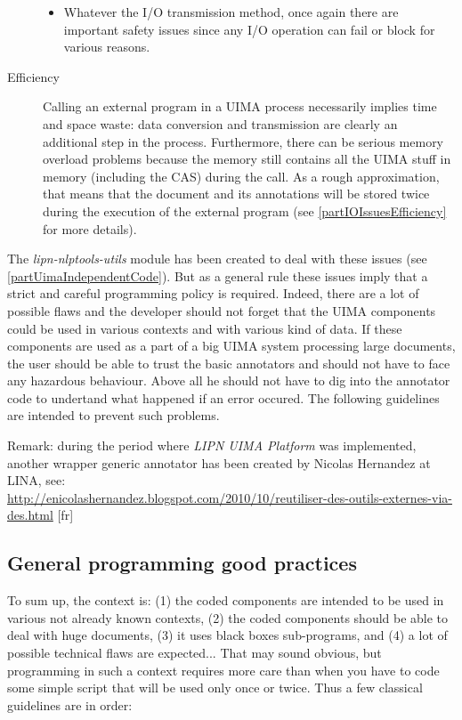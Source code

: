 \documentclass{article}
\newcommand{\softName}{{\em LIPN UIMA Platform}\xspace}
\newenvironment{xitemize}{
\begin{itemize}
  \setlength{\itemsep}{.3\baselineskip}
  \setlength{\topsep}{0pt}
  \setlength{\parskip}{0pt}
  \setlength{\parsep}{0pt}
}{\end{itemize}}
\newcommand{\utilsModule}{{\em lipn-nlptools-utils}\xspace}
\begin{document}
\begin{description}
\begin{xitemize}
\item Whatever the I/O transmission method, once again there are important safety issues since any I/O operation can fail or block for various reasons.
\end{xitemize}
\item[Efficiency] Calling an external program in a UIMA process necessarily implies time and space waste: data conversion and transmission are clearly an additional step in the process. Furthermore, there can be serious memory overload problems because the memory still contains all the UIMA stuff in memory (including the CAS) during the call. As a rough approximation, that means that the document and its annotations will be stored twice during the execution of the external program (see \ref{partIOIssuesEfficiency} for more details).
\end{description}

The \utilsModule module has been created to deal with these issues (see \ref{partUimaIndependentCode}). But as a general rule these issues imply that a strict and careful programming policy is required. Indeed, there are a lot of possible flaws and the developer should not forget that the UIMA components could be used in various contexts and with various kind of data. If these components are used as a part of a big UIMA system processing large documents, the user should be able to trust the basic annotators and should not have to face any hazardous behaviour. Above all he should not have to dig into the annotator code to undertand what happened if an error occured. The following guidelines are intended to prevent such problems.

Remark: during the period where \softName was implemented, another wrapper generic annotator has been created by Nicolas Hernandez at LINA, see:\\ \url{http://enicolashernandez.blogspot.com/2010/10/reutiliser-des-outils-externes-via-des.html} [fr]



\subsection{General programming good practices}
\label{part_good_practices}
\label{partFollowConventions}
To sum up, the context is: (1) the coded components are intended to be used in various not already known contexts, (2) the coded components should be able to deal with huge documents, (3) it uses black boxes sub-programs, and (4) a lot of possible technical flaws are expected... That may sound obvious, but programming in such a context requires more care than when you have to code some simple script that will be used only once or twice. Thus a few classical guidelines are in order:
\end{document}
